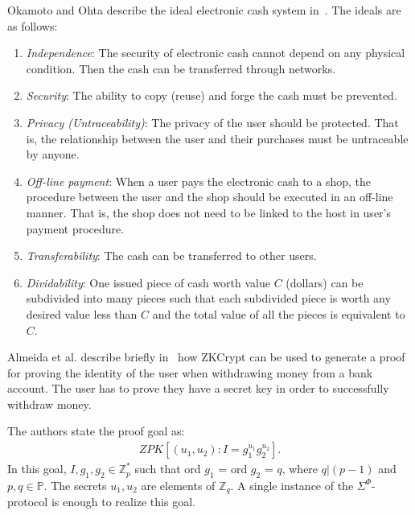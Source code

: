 \documentclass{sig-alternate}
\begin{document}
	Okamoto and Ohta describe the ideal electronic cash system in~\cite{Ecash:1991}.
	The ideals are as follows:
	
	\begin{enumerate}
		\item \textit{Independence}: The security of electronic cash cannot depend on any
		physical condition. Then the cash can be transferred through networks.
		
		\item \textit{Security}: The ability to copy (reuse) and forge the cash must be
		prevented.
		
		\item \textit{Privacy (Untraceability)}: The privacy of the user should be
		protected. That is, the relationship between the user and their purchases must
		be untraceable by anyone.
		
		\item \textit{Off-line payment}: When a user pays the electronic cash to a shop, 
		the procedure between the user and the shop should be executed in an off-line
		manner. That is, the shop does not need to be linked to the host in user's
		payment procedure.
		
		\item \textit{Transferability}: The cash can be transferred to other users.
		
		\item \textit{Dividability}: One issued piece of cash worth value $C$ (dollars)
		can be subdivided into many pieces such that each subdivided piece is worth any
		desired value less than $C$ and the total value of all the pieces is equivalent
		to $C$.
	\end{enumerate}
	
	Almeida et al. describe briefly in~\cite{ZKCrypt:2012} how ZKCrypt can be used to
	generate a proof for proving the identity of the user when withdrawing money from
	a bank account. The user has to prove they have a secret key in order to successfully
	withdraw money. 
	
	The authors state the proof goal as:
	\begin{align*}
	ZPK\left[(u_{1}, u_{2}): I = g^{u_{1}}_{1}g^{u_{2}}_{2}\right].
	\end{align*}
	In this goal, $I, g_{1}, g_{2} \in \mathbb{Z}^{*}_{p}$ such that ord $g_{1}$ = ord
	$g_{2}$ = $q$, where $q|(p - 1)$ and $p, q \in \mathbb{P}$. The secrets $u_{1}, u_{2}$
	are elements of $\mathbb{Z}_{q}$. A single instance of the $\Sigma^{\Phi}$-protocol
	is enough to realize this goal.
	
\end{document}
